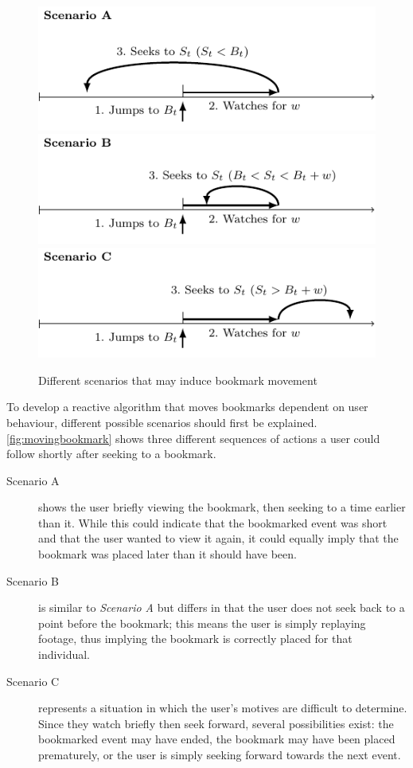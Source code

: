 

\begin{figure}[t]
    \centering

%    
    \includegraphics[width=0.7\columnwidth]{./diagrams/scenarios_A}
    \includegraphics[width=0.7\columnwidth]{./diagrams/scenarios_B}
    \includegraphics[width=0.7\columnwidth]{./diagrams/scenarios_C}

    \caption{Different scenarios that may induce bookmark movement}
    \label{fig:movingbookmark}
\end{figure}

To develop a reactive algorithm that moves bookmarks dependent on user behaviour, different possible scenarios should first be explained. \autoref{fig:movingbookmark} shows three different sequences of actions a user could follow shortly after seeking to a bookmark.

\begin{description}
  \item[Scenario A] shows the user briefly viewing the bookmark, then seeking to a time earlier than it. While this could indicate that the bookmarked event was short and that the user wanted to view it again, it could equally imply that the bookmark was placed later than it should have been.
  \item[Scenario B] is similar to \emph{Scenario A} but differs in that the user does not seek back to a point before the bookmark; this means the user is simply replaying footage, thus implying the bookmark is correctly placed for that individual.
  \item[Scenario C] represents a situation in which the user's motives are difficult to determine. Since they watch briefly then seek forward, several possibilities exist: the bookmarked event may have ended, the bookmark may have been placed prematurely, or the user is simply seeking forward towards the next event.
\end{description}

